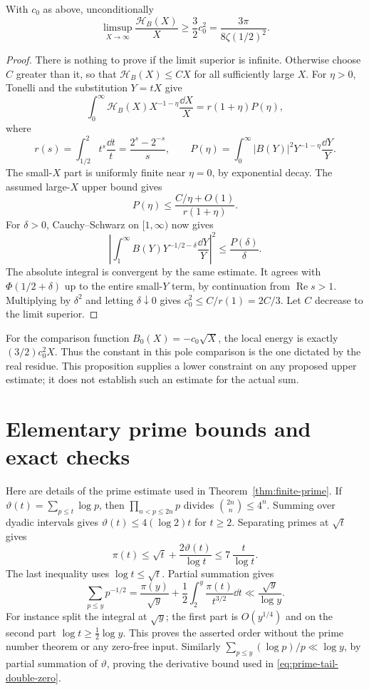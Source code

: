 \begin{proposition}
\label{prop:local-energy-lower}
With \(c_0\) as above, unconditionally
\[
 \limsup_{X\to\infty}\frac{\mathcal H_B(X)}X
 \ge\frac32c_0^2=\frac{3\pi}{8\zeta(1/2)^2}.
\]
\end{proposition}
\begin{proof}
There is nothing to prove if the limit superior is infinite.
Otherwise choose \(C\) greater than it, so that
\(\mathcal H_B(X)\le CX\) for all sufficiently large \(X\).
For \(\eta>0\), Tonelli and the substitution \(Y=tX\) give
\[
 \int_0^\infty\mathcal H_B(X)X^{-1-\eta}\frac{\dd X}{X}
 =r(1+\eta)P(\eta),
\]
where
\[
 r(s)=\int_{1/2}^2t^s\frac{\dd t}{t}
     =\frac{2^s-2^{-s}}s,\qquad
 P(\eta)=\int_0^\infty|B(Y)|^2Y^{-1-\eta}\frac{\dd Y}{Y}.
\]
The small-\(X\) part is uniformly finite near \(\eta=0\),
by exponential decay. The assumed large-\(X\) upper bound gives
\[
 P(\eta)\le\frac{C/\eta+O(1)}{r(1+\eta)}.
\]
For \(\delta>0\), Cauchy--Schwarz on \([1,\infty)\) now gives
\[
 \left|\int_1^\infty B(Y)Y^{-1/2-\delta}
                       \frac{\dd Y}{Y}\right|^2
 \le\frac{P(\delta)}{\delta}.
\]
The absolute integral is convergent by the same estimate.
It agrees with \(\Phi(1/2+\delta)\) up to the entire
small-\(Y\) term, by continuation from
\(\operatorname{Re}s>1\). Multiplying by \(\delta^2\) and
letting \(\delta\downarrow0\) gives
\(c_0^2\le C/r(1)=2C/3\).
Let \(C\) decrease to the limit superior.
\end{proof}

For the comparison function \(B_0(X)=-c_0\sqrt X\), the local energy
is exactly \((3/2)c_0^2X\). Thus the constant in this pole comparison
is the one dictated by the real residue. This proposition supplies
a lower constraint on any proposed upper estimate; it does not
establish such an estimate for the actual sum.

\section{Elementary prime bounds and exact checks}
\label{app:attack-checks}

Here are details of the prime estimate used in
Theorem~\ref{thm:finite-prime}. If
\(\vartheta(t)=\sum_{p\le t}\log p\), then
\(\prod_{n<p\le2n}p\) divides \(\binom{2n}{n}\le4^n\).
Summing over dyadic intervals gives
\(\vartheta(t)\le4(\log2)t\) for \(t\ge2\). Separating
primes at \(\sqrt t\) gives
\[
 \pi(t)\le\sqrt t+\frac{2\vartheta(t)}{\log t}
        \le7\,\frac t{\log t}.
\]
The last inequality uses \(\log t\le\sqrt t\).
Partial summation gives
\[
 \sum_{p\le y}p^{-1/2}
 =\frac{\pi(y)}{\sqrt y}
  +\frac12\int_2^y\frac{\pi(t)}{t^{3/2}}\dd t
 \ll\frac{\sqrt y}{\log y}.
\]
For instance split the integral at \(\sqrt y\); the first
part is \(O(y^{1/4})\) and on the second part
\(\log t\ge\frac12\log y\). This proves the asserted order
without the prime number theorem or any zero-free input.
Similarly
\(\sum_{p\le y}(\log p)/p\ll\log y\), by partial summation
of \(\vartheta\), proving the derivative bound used in
\eqref{eq:prime-tail-double-zero}.

